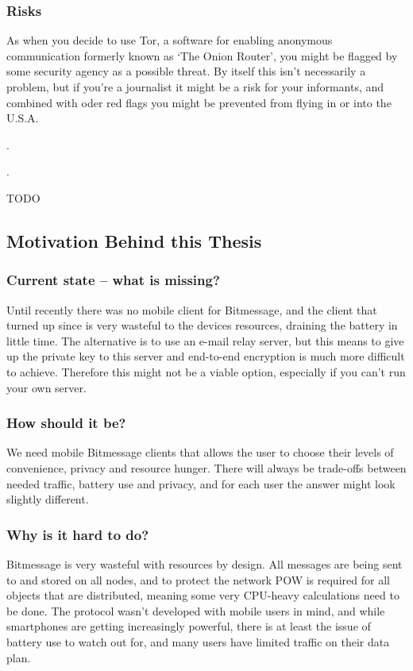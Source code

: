 \documentclass{bfh}
\begin{document}
  \subsubsection{Risks}
  As when you decide to use Tor, a software for enabling anonymous communication formerly known as `The Onion Router', you might be flagged by some security agency as a possible threat.\cite{wired:tor} By itself this isn't necessarily a problem, but if you're a journalist it might be a risk for your informants, and combined with oder red flags you might be prevented from flying in or into the U.S.A.

  .

  .

  TODO


  \subsection{Motivation Behind this Thesis}
  \subsubsection{Current state -- what is missing?}
  Until recently there was no mobile client for Bitmessage, and the client that turned up since is very wasteful to the devices resources, draining the battery in little time. The alternative is to use an e-mail relay server, but this means to give up the private key to this server and end-to-end encryption is much more difficult to achieve. Therefore this might not be a viable option, especially if you can't run your own server.

  \subsubsection{How should it be?}
  We need mobile Bitmessage clients that allows the user to choose their levels of convenience, privacy and resource hunger. There will always be trade-offs between needed traffic, battery use and privacy, and for each user the answer might look slightly different.

  \subsubsection{Why is it hard to do?}
  Bitmessage is very wasteful with resources by design. All messages are being sent to and stored on all nodes, and to protect the network \ac{POW} is required for all objects that are distributed, meaning some very \acs{CPU}-heavy calculations need to be done. The protocol wasn't developed with mobile users in mind, and while smartphones are getting increasingly powerful, there is at least the issue of battery use to watch out for, and many users have limited traffic on their data plan.
\end{document}
